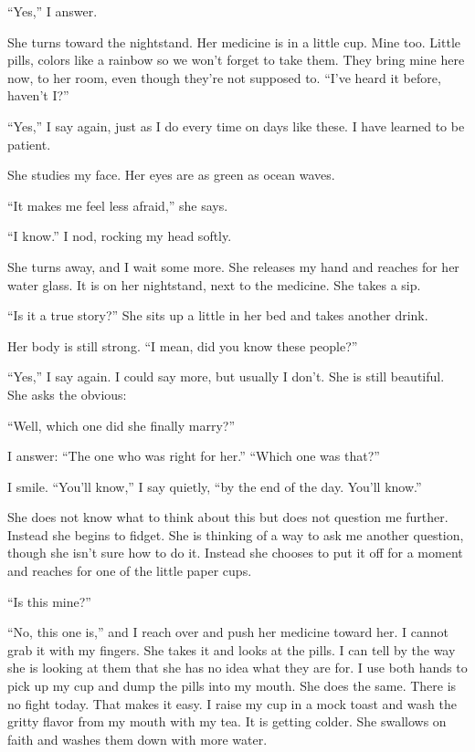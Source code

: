 \documentclass[10pt, twoside, openright]{book}
\begin{document}
``Yes,'' I answer.


She turns toward the nightstand. Her medicine is in a little cup. Mine
too. Little pills, colors like a rainbow so we won't forget to take
them. They bring mine here now, to her room, even though they're not
supposed to. ``I've heard it before, haven't I?''

``Yes,'' I say again, just as I do every time on days like these. I have
learned to be patient.


She studies my face. Her eyes are as green as ocean waves.

``It makes me feel less afraid,'' she says.

``I know.'' I nod, rocking my head softly.


She turns away, and I wait some more. She releases my hand and reaches
for her water glass. It is on her nightstand, next to the medicine. She
takes a sip.


``Is it a true story?'' She sits up a little in her bed and takes
another drink.


Her body is still strong. ``I mean, did you know these people?''

``Yes,'' I say again. I could say more, but usually I don't. She is
still beautiful. She asks the obvious:


``Well, which one did she finally marry?''

I answer: ``The one who was right for her.'' ``Which one was that?''


I smile. ``You'll know,'' I say quietly, ``by the end of the day. You'll
know.''

She does not know what to think about this but does not question me
further. Instead she begins to fidget. She is thinking of a way to ask
me another question, though she isn't sure how to do it. Instead she
chooses to put it off for a moment and reaches for one of the little
paper cups.


``Is this mine?''


``No, this one is,'' and I reach over and push her medicine toward her.
I cannot grab it with my fingers. She takes it and looks at the pills. I
can tell by the way she is looking at them that she has no idea what
they are for. I use both hands to pick up my cup and dump the pills into
my mouth. She does the same. There is no fight today. That makes it
easy. I raise my cup in a mock toast and wash the gritty flavor from my
mouth with my tea. It is getting colder. She swallows on faith and
washes them down with more water.
\end{document}
